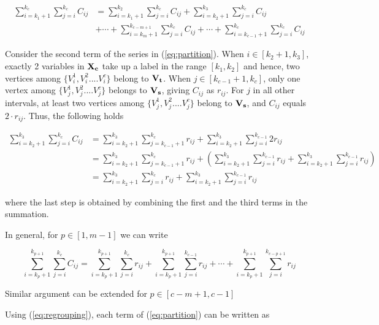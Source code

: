 \documentclass[10pt,letterpaper]{article}
\begin{document}
\begin{align}
	\sum_{i=k_{1}+1}^{k_{c}} \sum_{j=i}^{k_{c}} C_{ij} &= \sum_{i=k_{1}+1}^{k_{2}} \sum_{j=i}^{k_{c}} C_{ij} +
\sum_{i=k_{2}+1}^{k_3} \sum_{j=i}^{k_{c}} C_{ij} \nonumber \\ &+\dotsb+  
\sum_{i=k_{m}+1}^{k_{c-m+1}} \sum_{j=i}^{k_{c}} C_{ij} +\dotsb+ \sum_{i=k_{c-1}+1}^{k_{c}} \sum_{j=i}^{k_{c}} C_{ij}
\label{eq:partition}
\end{align}

Consider the second term of the series in (\ref{eq:partition}). When $i \in [k_2 + 1, k_3]$, exactly 2 variables in ${\bf{X_c}}$ take up a label in the range $[k_1, k_2]$ and hence, two vertices among $\{V^1_i, V^2_i....V^c_i\}$ belong to $\bf{V}_{t}$. When $j \in [k_{c-1} + 1, k_c]$, only one vertex among $\{V^1_j, V^2_j....V^c_j\}$ belongs to $\bf{V}_{s}$, giving $C_{ij}$ as $r_{ij}$. For $j$ in all other intervals, at least two vertices among $\{V^1_j, V^2_j....V^c_j\}$ belong to $\bf{V}_{s}$, and $C_{ij}$ equals $2 \cdot r_{ij}$. Thus, the following holds


\begin{align*}
\sum_{i=k_{2}+1}^{k_3} \sum_{j=i}^{k_{c}} C_{ij} &= \sum_{i=k_{2}+1}^{k_3} \sum_{j=k_{c-1} + 1}^{k_{c}} r_{ij} + \sum_{i=k_{2}+1}^{k_3} \sum_{j=i}^{k_{c-1}} 2r_{ij} \\
&= \sum_{i=k_{2}+1}^{k_3} \sum_{j=k_{c-1} + 1}^{k_{c}} r_{ij} + \left(\sum_{i=k_{2}+1}^{k_3} \sum_{j=i}^{k_{c-1}} r_{ij} + \sum_{i=k_{2}+1}^{k_3} \sum_{j=i}^{k_{c-1}} r_{ij}\right)\\
&= \sum_{i=k_{2}+1}^{k_3} \sum_{j=i}^{k_{c}} r_{ij} + \sum_{i=k_{2}+1}^{k_3} \sum_{j=i}^{k_{c-1}} r_{ij}
\end{align*} 

where the last step is obtained by combining the first and the third terms in the summation.

In general, for $p \in [1, m-1]$ we can write

\begin{equation}
\sum_{i=k_{p}+1}^{k_{p+1}} \sum_{j=i}^{k_{c}} C_{ij} = \sum_{i=k_{p}+1}^{k_{p+1}} \sum_{j=i}^{k_{c}} r_{ij} + \sum_{i=k_{p}+1}^{k_{p+1}} \sum_{j=i}^{k_{c-1}} r_{ij} +\dotsb+ \sum_{i=k_{p}+1}^{k_{p+1}} \sum_{j=i}^{k_{c-p+1}} r_{ij}
\label{eq:regrouping}
\end{equation}

Similar argument can be extended for $p \in [c-m+1, c-1]$
 
\newpage
Using (\ref{eq:regrouping}), each term of (\ref{eq:partition}) can be written as
\end{document}
